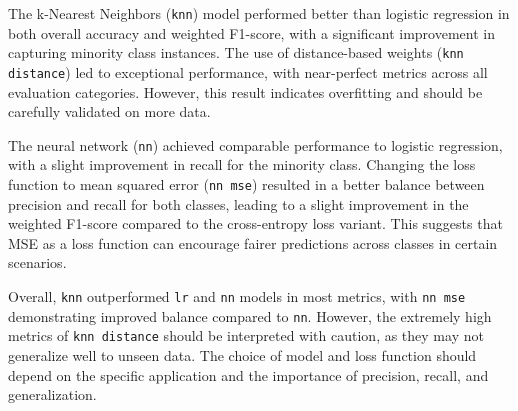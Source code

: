The k-Nearest Neighbors (\texttt{knn}) model performed better than logistic regression in both overall accuracy and weighted F1-score, with a significant improvement in capturing minority class instances. The use of distance-based weights (\texttt{knn distance}) led to exceptional performance, with near-perfect metrics across all evaluation categories. However, this result indicates overfitting and should be carefully validated on more data.

The neural network (\texttt{nn}) achieved comparable performance to logistic regression, with a slight improvement in recall for the minority class. Changing the loss function to mean squared error (\texttt{nn mse}) resulted in a better balance between precision and recall for both classes, leading to a slight improvement in the weighted F1-score compared to the cross-entropy loss variant. This suggests that MSE as a loss function can encourage fairer predictions across classes in certain scenarios.

Overall, \texttt{knn} outperformed \texttt{lr} and \texttt{nn} models in most metrics, with \texttt{nn mse} demonstrating improved balance compared to \texttt{nn}. However, the extremely high metrics of \texttt{knn distance} should be interpreted with caution, as they may not generalize well to unseen data. The choice of model and loss function should depend on the specific application and the importance of precision, recall, and generalization.
